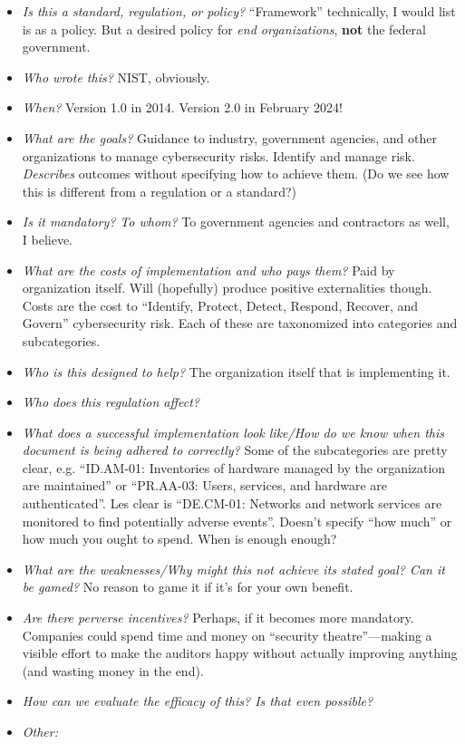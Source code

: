 \documentclass[11pt]{article}
\begin{document}
\begin{itemize}
    \item {\it Is this a standard, regulation, or policy?} ``Framework'' technically, I would list is as a policy. But a desired policy for {\it end organizations}, {\bf not} the federal government.
    \item {\it Who wrote this?} NIST, obviously.
    \item {\it When?} Version 1.0 in 2014. Version 2.0 in February 2024!
    \item {\it What are the goals?} Guidance to industry, government agencies, and other organizations to manage cybersecurity risks. Identify and manage risk. {\it Describes } outcomes without specifying how to achieve them. (Do we see how this is different from a regulation or a standard?)
    \item {\it Is it mandatory? To whom?} To government agencies and contractors as well, I believe. 
    \item {\it What are the costs of implementation and who pays them?} Paid by organization itself. Will (hopefully) produce positive externalities though. Costs are the cost to ``Identify, Protect, Detect, Respond, Recover, and Govern'' cybersecurity risk. Each of these are taxonomized into categories and subcategories. 
    \item {\it Who is this designed to help?} The organization itself that is implementing it.
    \item {\it Who does this regulation affect?} 
    \item {\it What does a successful implementation look like/How do we know when this document is being adhered to correctly?} Some of the subcategories are pretty clear, e.g. ``ID.AM-01: Inventories of hardware managed by the organization are maintained'' or ``PR.AA-03: Users, services, and hardware are authenticated''. Les clear is ``DE.CM-01: Networks and network services are monitored to find potentially adverse events''. Doesn't specify ``how much'' or how much you ought to spend. When is enough enough?
    \item {\it What are the weaknesses/Why might this not achieve its stated goal? Can it be gamed?} No reason to game it if it's for your own benefit. 
    \item {\it Are there perverse incentives?} Perhaps, if it becomes more mandatory. Companies could spend time and money on ``security theatre''---making a visible effort to make the auditors happy without actually improving anything (and wasting money in the end).
    \item {\it How can we evaluate the efficacy of this? Is that even possible?}
    \item {\it Other:}
\end{itemize}
\end{document}
